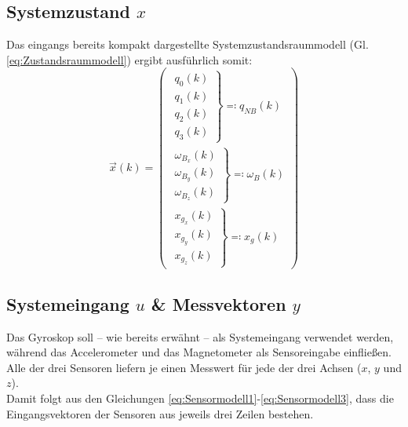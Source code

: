 \documentclass[12pt,a4paper]{article}
\begin{document}
		\subsection{Systemzustand $x$}\label{subsec:Systemzustand}
		Das eingangs bereits kompakt dargestellte Systemzustandsraummodell (Gl. \ref{eq:Zustandsraummodell}) ergibt ausführlich somit: 
		\begin{equation}\label{eq:Systemzustand}
			\vec{x}(k)=\begin{pmatrix}
			\left. \begin{array}{c}q_{0}(k)\\q_{1}(k)\\q_{2}(k)\\q_{3}(k)\end{array}\right\}\eqqcolon q_{NB}(k)\\[2.0em]
			\left. \begin{array}{c}\omega_{B_{x}}(k)\\\omega_{B_{y}}(k)\\\omega_{B_{z}}(k)\end{array}\right\}\eqqcolon \omega_{B}(k)\\[1.5em]
			\left. \begin{array}{c}x_{g_{x}}(k)\\x_{g_{y}}(k)\\x_{g_{z}}(k)\end{array}\right\}\eqqcolon x_{g}(k)
			\end{pmatrix}
		\end{equation}
		\subsection{Systemeingang $u$ \& Messvektoren $y$}\label{subsec:Systemeingang&Messvektoren}
		Das Gyroskop soll -- wie bereits erwähnt -- als Systemeingang verwendet werden, während das Accelerometer und das Magnetometer als Sensoreingabe einfließen. Alle der drei Sensoren liefern je einen Messwert für jede der drei Achsen ($x$, $y$ und $z$).\\
		Damit folgt aus den Gleichungen \ref{eq:Sensormodell1}-\ref{eq:Sensormodell3}, dass die Eingangsvektoren der Sensoren aus jeweils drei Zeilen bestehen.
\end{document}
